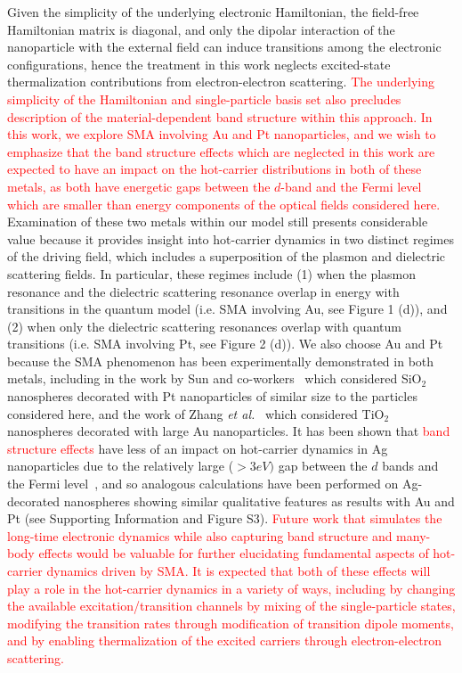 \documentclass[journal=jpclcd,manuscript=article]{achemso}
\begin{document}
Given the simplicity of the underlying electronic Hamiltonian, the field-free Hamiltonian matrix is diagonal, and only the dipolar
interaction of the nanoparticle with the external field can induce transitions among the electronic configurations, hence the treatment in 
this work neglects excited-state thermalization contributions from electron-electron scattering. 
\textcolor{red}{The underlying simplicity of the Hamiltonian and single-particle basis set also precludes description
of the material-dependent band structure within this approach.  
In this work, we explore SMA involving Au and Pt nanoparticles, and we wish to emphasize that the band structure effects 
which are neglected in this work are expected to have an impact on the hot-carrier distributions in both of these metals, 
as both have energetic gaps between the $d$-band and the Fermi level which are smaller than energy components of the optical fields
considered here.}  Examination of these two metals within our model still presents considerable value because it provides
insight into hot-carrier dynamics in two distinct regimes of the driving field, which includes a superposition
of the plasmon and dielectric scattering fields.  In particular, these regimes include (1) when the plasmon 
resonance and the dielectric scattering resonance overlap in energy with transitions in the quantum model 
(i.e. SMA involving Au, see Figure 1 (d)), 
and (2) when only the dielectric scattering resonances overlap with 
quantum transitions (i.e. SMA involving Pt, see Figure 2 (d)).   
We also choose Au and Pt because the SMA phenomenon
has been experimentally demonstrated in both metals, including in the work by Sun and co-workers~\cite{ZHX_NatPhoton_2016} which
considered SiO$_2$ nanospheres decorated with Pt nanoparticles of similar size to the particles considered here, and the work of 
Zhang {\it et al.}~\cite{ZJM_ACSNano_2016} which considered
TiO$_2$ nanospheres decorated with large Au nanoparticles.  It has been shown that \textcolor{red}{band structure effects} have less of an impact
on hot-carrier dynamics in Ag nanoparticles due to the relatively large ($> 3eV)$ gap between the $d$ bands and the Fermi level~\cite{MLK_ACSNano_2014,Atwater_Review}, and so
analogous calculations have been performed on Ag-decorated nanospheres showing similar qualitative features
as results with Au and Pt (see Supporting Information and Figure S3).
\textcolor{red}{Future work that simulates the long-time electronic dynamics while also capturing band structure
and many-body effects would be valuable for further elucidating fundamental aspects of hot-carrier dynamics driven by SMA.  
It is expected
that both of these effects will play a role in the hot-carrier dynamics in a variety of ways, including by changing the 
available excitation/transition channels
by mixing of the single-particle states, modifying the transition rates through 
modification of transition dipole moments, and by enabling
thermalization of the excited carriers through electron-electron scattering.}
\end{document}
